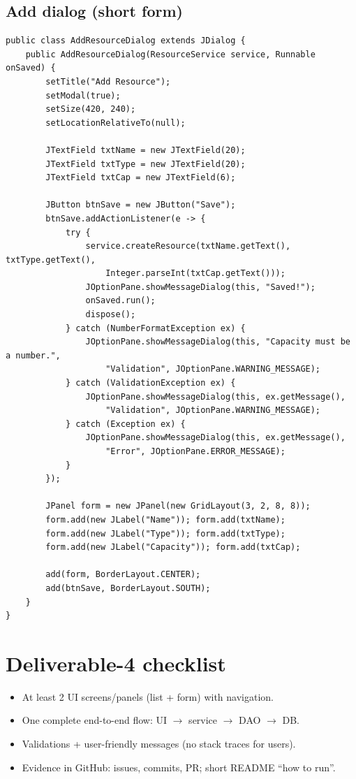 \documentclass[11pt]{article}
\begin{document}
\subsection{Add dialog (short form)}
\begin{lstlisting}
public class AddResourceDialog extends JDialog {
    public AddResourceDialog(ResourceService service, Runnable onSaved) {
        setTitle("Add Resource");
        setModal(true);
        setSize(420, 240);
        setLocationRelativeTo(null);

        JTextField txtName = new JTextField(20);
        JTextField txtType = new JTextField(20);
        JTextField txtCap = new JTextField(6);

        JButton btnSave = new JButton("Save");
        btnSave.addActionListener(e -> {
            try {
                service.createResource(txtName.getText(), txtType.getText(),
                    Integer.parseInt(txtCap.getText()));
                JOptionPane.showMessageDialog(this, "Saved!");
                onSaved.run();
                dispose();
            } catch (NumberFormatException ex) {
                JOptionPane.showMessageDialog(this, "Capacity must be a number.",
                    "Validation", JOptionPane.WARNING_MESSAGE);
            } catch (ValidationException ex) {
                JOptionPane.showMessageDialog(this, ex.getMessage(),
                    "Validation", JOptionPane.WARNING_MESSAGE);
            } catch (Exception ex) {
                JOptionPane.showMessageDialog(this, ex.getMessage(),
                    "Error", JOptionPane.ERROR_MESSAGE);
            }
        });

        JPanel form = new JPanel(new GridLayout(3, 2, 8, 8));
        form.add(new JLabel("Name")); form.add(txtName);
        form.add(new JLabel("Type")); form.add(txtType);
        form.add(new JLabel("Capacity")); form.add(txtCap);

        add(form, BorderLayout.CENTER);
        add(btnSave, BorderLayout.SOUTH);
    }
}
\end{lstlisting}

\section{Deliverable-4 checklist}
\begin{itemize}
  \item At least 2 UI screens/panels (list + form) with navigation.
  \item One complete end-to-end flow: UI $\rightarrow$ service $\rightarrow$ DAO $\rightarrow$ DB.
  \item Validations + user-friendly messages (no stack traces for users).
  \item Evidence in GitHub: issues, commits, PR; short README ``how to run''.
\end{itemize}
\end{document}
